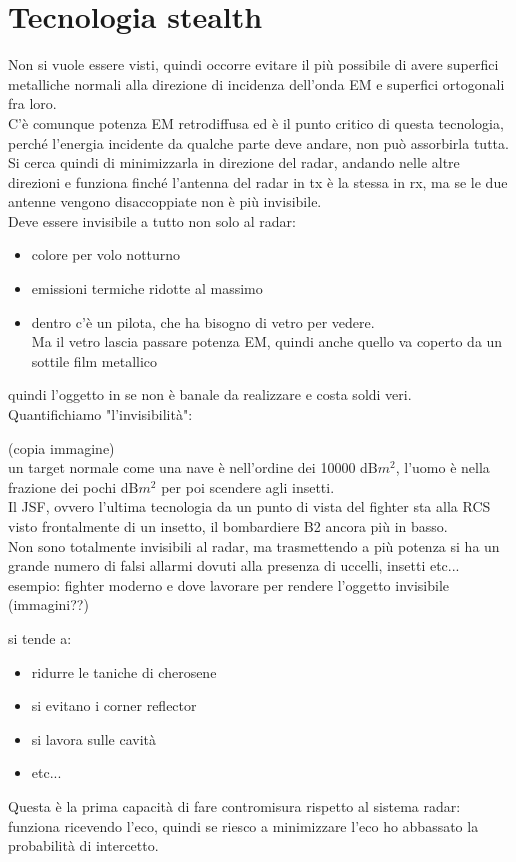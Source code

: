 \documentclass[oneside, 12pt]{extbook}
\begin{document}
\section{Tecnologia stealth}
Non si vuole essere visti, quindi occorre evitare il più possibile di avere superfici metalliche normali alla direzione di incidenza dell'onda EM e superfici ortogonali fra loro.\\
C'è comunque potenza EM retrodiffusa ed è il punto critico di questa tecnologia, perché l'energia incidente da qualche parte deve andare, non può assorbirla tutta.\\
Si cerca quindi di minimizzarla in direzione del radar, andando nelle altre direzioni e funziona finché l'antenna del radar in tx è la stessa in rx, ma se le due antenne vengono disaccoppiate non è più invisibile.\\
Deve essere invisibile a tutto non solo al radar:
\begin{itemize}
	\item colore per volo notturno
	\item emissioni termiche ridotte al massimo
	\item dentro c'è un pilota, che ha bisogno di vetro per vedere.\\
	Ma il vetro lascia passare potenza EM, quindi anche quello va coperto da un sottile film metallico
\end{itemize}
quindi l'oggetto in se non è banale da realizzare e costa soldi veri.\\
Quantifichiamo "l'invisibilità":

(copia immagine)\\
un target normale come una nave è nell'ordine dei 10000 dB$m^2$, l'uomo è nella frazione dei pochi dB$m^2$ per poi scendere agli insetti.\\
Il JSF, ovvero l'ultima tecnologia da un punto di vista del fighter sta alla RCS visto frontalmente di un insetto, il bombardiere B2 ancora più in basso.\\
Non sono totalmente invisibili al radar, ma trasmettendo a più potenza si ha un grande numero di falsi allarmi dovuti alla presenza di uccelli, insetti etc...\\
esempio: fighter moderno e dove lavorare per rendere l'oggetto invisibile (immagini??)

si tende a:
\begin{itemize}
	\item ridurre le taniche di cherosene
	\item si evitano i corner reflector
	\item si lavora sulle cavità
	\item etc...
\end{itemize}
Questa è la prima capacità di fare contromisura rispetto al sistema radar: funziona ricevendo l'eco, quindi se riesco a minimizzare l'eco ho abbassato la probabilità di intercetto.
\end{document}
